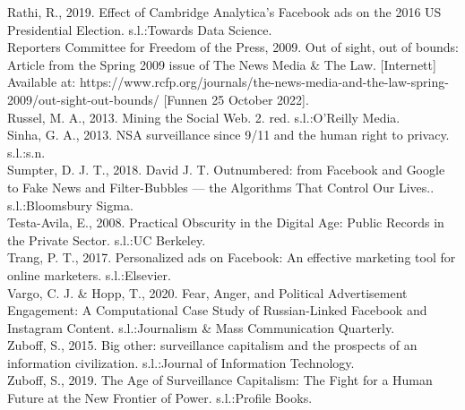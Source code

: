 \documentclass[11pt]{article}
\begin{document}
Rathi, R., 2019. Effect of Cambridge Analytica’s Facebook ads on the 2016 US Presidential Election. s.l.:Towards Data Science. \\

Reporters Committee for Freedom of the Press, 2009. Out of sight, out of bounds: Article from the Spring 2009 issue of The News Media \& The Law. [Internett]  
Available at: https://www.rcfp.org/journals/the-news-media-and-the-law-spring-2009/out-sight-out-bounds/ 
[Funnen 25 October 2022]. \\

Russel, M. A., 2013. Mining the Social Web. 2. red. s.l.:O'Reilly Media. \\

Sinha, G. A., 2013. NSA surveillance since 9/11 and the human right to privacy. s.l.:s.n.\\ 

Sumpter, D. J. T., 2018. David J. T. Outnumbered: from Facebook and Google to Fake News and Filter-Bubbles — the Algorithms That Control Our Lives.. s.l.:Bloomsbury Sigma. \\

Testa-Avila, E., 2008. Practical Obscurity in the Digital Age: Public Records in the Private Sector. s.l.:UC Berkeley. \\

Trang, P. T., 2017. Personalized ads on Facebook: An effective marketing tool for online marketers. s.l.:Elsevier. \\

Vargo, C. J. \& Hopp, T., 2020. Fear, Anger, and Political Advertisement Engagement: A Computational Case Study of Russian-Linked Facebook and Instagram Content. s.l.:Journalism \& Mass Communication Quarterly. \\

Zuboff, S., 2015. Big other: surveillance capitalism and the prospects of an information civilization. s.l.:Journal of Information Technology. \\

Zuboff, S., 2019. The Age of Surveillance Capitalism: The Fight for a Human Future at the New Frontier of Power. s.l.:Profile Books. \\
\end{document}
